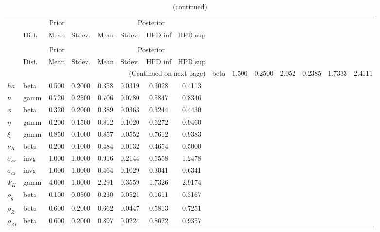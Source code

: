  
\begin{center}
\begin{longtable}{llcccccc} 
\caption{Results from Metropolis-Hastings (parameters)}
 \label{Table:MHPosterior:1}\\
\toprule 
  & \multicolumn{3}{c}{Prior}  &  \multicolumn{4}{c}{Posterior} \\
  \cmidrule(r{.75em}){2-4} \cmidrule(r{.75em}){5-8}
  & Dist. & Mean  & Stdev. & Mean & Stdev. & HPD inf & HPD sup\\
\midrule \endfirsthead 
\caption{(continued)}\\\toprule 
  & \multicolumn{3}{c}{Prior}  &  \multicolumn{4}{c}{Posterior} \\
  \cmidrule(r{.75em}){2-4} \cmidrule(r{.75em}){5-8}
  & Dist. & Mean  & Stdev. & Mean & Stdev. & HPD inf & HPD sup\\
\midrule \endhead 
\bottomrule \multicolumn{8}{r}{(Continued on next page)} \endfoot 
\bottomrule \endlastfoot 
${\sigma}$ & beta &   1.500 & 0.2500 &   2.052& 0.2385 &  1.7333 &  2.4111 \\ 
${ha}$ & beta &   0.500 & 0.2000 &   0.358& 0.0319 &  0.3028 &  0.4113 \\ 
$\nu$ & gamm &   0.720 & 0.2500 &   0.706& 0.0780 &  0.5847 &  0.8346 \\ 
${\phi}$ & beta &   0.320 & 0.2000 &   0.389& 0.0363 &  0.3244 &  0.4430 \\ 
${\eta}$ & gamm &   0.200 & 0.1500 &   0.812& 0.1020 &  0.6272 &  0.9460 \\ 
$\xi$ & gamm &   0.850 & 0.1000 &   0.857& 0.0552 &  0.7612 &  0.9383 \\ 
${\nu_R}$ & beta &   0.200 & 0.1000 &   0.484& 0.0132 &  0.4654 &  0.5000 \\ 
${\sigma_{ac}}$ & invg &   1.000 & 1.0000 &   0.916& 0.2144 &  0.5558 &  1.2478 \\ 
${\sigma_{ai}}$ & invg &   1.000 & 1.0000 &   0.464& 0.1029 &  0.3041 &  0.6341 \\ 
${\Psi_{K}}$ & gamm &   4.000 & 1.0000 &   2.291& 0.3559 &  1.7326 &  2.9174 \\ 
${\rho_g}$ & beta &   0.100 & 0.0500 &   0.230& 0.0521 &  0.1611 &  0.3167 \\ 
${\rho_Z}$ & beta &   0.600 & 0.2000 &   0.662& 0.0447 &  0.5813 &  0.7251 \\ 
${\rho_{ZI}}$ & beta &   0.600 & 0.2000 &   0.897& 0.0224 &  0.8622 &  0.9357 \\ 

\end{longtable}
\end{center}
